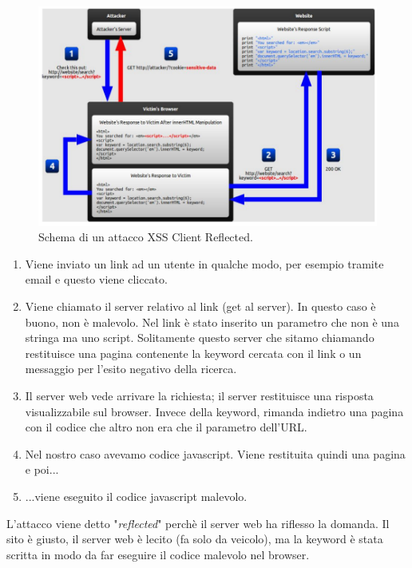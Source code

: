 \begin{figure}[H]
      \centering
      \includegraphics[width=\textwidth, keepaspectratio]{capitoli/secure_coding/img/cap_9/xss1.png}
      \caption{Schema di un attacco XSS Client Reflected.}
\end{figure}

\begin{enumerate}
      \item Viene inviato un link ad un utente in qualche modo, per esempio
            tramite email e
            questo viene cliccato.
      \item Viene chiamato il server relativo al link (get al server).
            In questo caso è buono, non è
            malevolo. Nel link è stato inserito un parametro che non è una stringa
            ma uno script.
            Solitamente questo server che sitamo chiamando restituisce una
            pagina contenente la keyword
            cercata con il link
            o un messaggio per l'esito negativo della ricerca.
      \item Il server web vede arrivare la richiesta; il server restituisce una
            risposta visualizzabile
            sul browser. Invece della keyword, rimanda indietro una pagina con il codice
            che
            altro non era che il parametro dell'URL.
      \item Nel nostro caso avevamo codice javascript.
            Viene restituita quindi una pagina e poi...
      \item ...viene eseguito il codice javascript malevolo.
\end{enumerate}

L'attacco viene detto "\textit{reflected}" perchè il server web ha riflesso la
domanda. Il sito è giusto,
il server web è lecito (fa solo da veicolo), ma la keyword è stata scritta in
modo da far eseguire il codice malevolo nel browser.

